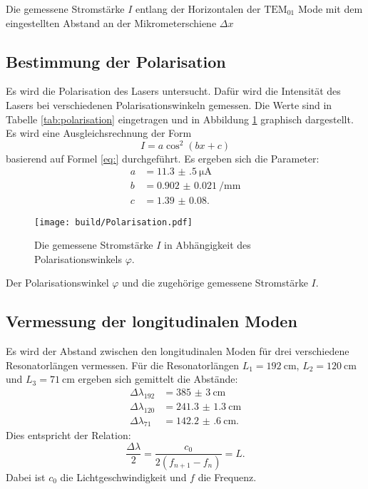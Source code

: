 \begin{table}
	\centering
	\caption{Die gemessene Stromstärke $I$ entlang der Horizontalen der $\text{TEM}_{\text{01}}$ Mode mit dem eingestellten Abstand an der Mikrometerschiene $\Delta x$}
	
	
	\label{tab:T01}
\end{table}

\subsection{Bestimmung der Polarisation}

Es wird die Polarisation des Lasers untersucht. Dafür wird die Intensität des Lasers bei verschiedenen Polarisationswinkeln gemessen. Die Werte sind in Tabelle \ref{tab:polarisation} eingetragen und in Abbildung \ref{fig:polarisation} graphisch dargestellt. 
Es wird eine Ausgleichsrechnung der Form
\[
I = a\cos^2\left(bx+c\right)
\] 
basierend auf Formel \eqref{eq:} durchgeführt.
Es ergeben sich die Parameter:
\begin{align*}
a &= \SI{11.3(5)}{\micro\ampere}\\
b &= \SI{0.902(21)}{\per\milli\metre}\\
c &= \num{1.39(8)}\text{.}
\end{align*}

\begin{figure}
	\centering
	\texttt{[image: build/Polarisation.pdf]}
	\caption{Die gemessene Stromstärke $I$ in Abhängigkeit des Polarisationswinkels $\varphi$.}
	\label{fig:polarisation}
\end{figure}

\begin{table}
	\centering
	\caption{Der Polarisationswinkel $\varphi$ und die zugehörige gemessene Stromstärke $I$.}
	
	\label{tab:polarisation}
\end{table}

\subsection{Vermessung der longitudinalen Moden}

Es wird der Abstand zwischen den longitudinalen Moden für drei verschiedene Resonatorlängen vermessen.
Für die Resonatorlängen $L_1=\SI{192}{\centi\metre}$, $L_2=\SI{120}{\centi\metre}$ und $L_3=\SI{71}{\centi\metre}$ ergeben sich gemittelt die Abstände:
\begin{align*}
\Delta\lambda_{192} &= \SI{385(3)}{\centi\metre}\\
\Delta\lambda_{120} &= \SI{241.3(13)}{\centi\metre}\\
\Delta\lambda_{71} &= \SI{142.2(6)}{\centi\metre}\text{.}
\end{align*}
Dies entspricht der Relation:
\[
\frac{\Delta\lambda}{2} = \frac{c_0}{2(f_{n+1}-f_n)} = L \text{.}
\]
Dabei ist $c_0$ die Lichtgeschwindigkeit und $f$ die Frequenz.

